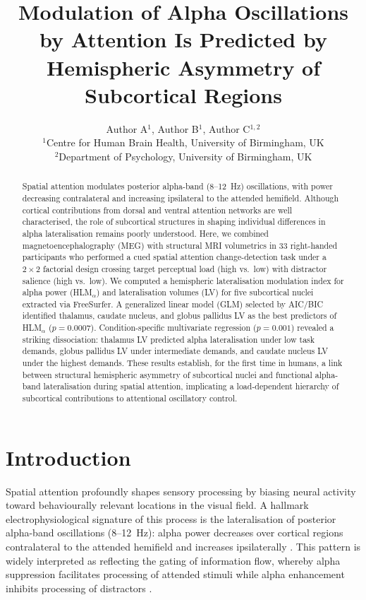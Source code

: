 \documentclass[11pt]{article}
\title{Modulation of Alpha Oscillations by Attention Is Predicted by Hemispheric Asymmetry of Subcortical Regions}
\author{Author A$^{1}$, Author B$^{1}$, Author C$^{1,2}$\\
\small $^{1}$Centre for Human Brain Health, University of Birmingham, UK\\
\small $^{2}$Department of Psychology, University of Birmingham, UK}
\date{}
\begin{document}
\maketitle

\begin{abstract}
Spatial attention modulates posterior alpha-band (8--12~Hz) oscillations, with power decreasing contralateral and increasing ipsilateral to the attended hemifield. Although cortical contributions from dorsal and ventral attention networks are well characterised, the role of subcortical structures in shaping individual differences in alpha lateralisation remains poorly understood. Here, we combined magnetoencephalography (MEG) with structural MRI volumetrics in 33 right-handed participants who performed a cued spatial attention change-detection task under a $2 \times 2$ factorial design crossing target perceptual load (high vs.\ low) with distractor salience (high vs.\ low). We computed a hemispheric lateralisation modulation index for alpha power (HLM$_\alpha$) and lateralisation volumes (LV) for five subcortical nuclei extracted via FreeSurfer. A generalized linear model (GLM) selected by AIC/BIC identified thalamus, caudate nucleus, and globus pallidus LV as the best predictors of HLM$_\alpha$ ($p = 0.0007$). Condition-specific multivariate regression ($p = 0.001$) revealed a striking dissociation: thalamus LV predicted alpha lateralisation under low task demands, globus pallidus LV under intermediate demands, and caudate nucleus LV under the highest demands. These results establish, for the first time in humans, a link between structural hemispheric asymmetry of subcortical nuclei and functional alpha-band lateralisation during spatial attention, implicating a load-dependent hierarchy of subcortical contributions to attentional oscillatory control.
\end{abstract}

\section{Introduction}

Spatial attention profoundly shapes sensory processing by biasing neural activity toward behaviourally relevant locations in the visual field. A hallmark electrophysiological signature of this process is the lateralisation of posterior alpha-band oscillations (8--12~Hz): alpha power decreases over cortical regions contralateral to the attended hemifield and increases ipsilaterally \citep{worden2000anticipatory, thut2006alpha, foxe2011role}. This pattern is widely interpreted as reflecting the gating of information flow, whereby alpha suppression facilitates processing of attended stimuli while alpha enhancement inhibits processing of distractors \citep{klimesch2007eeg, jensen2002oscillations}.
\end{document}
